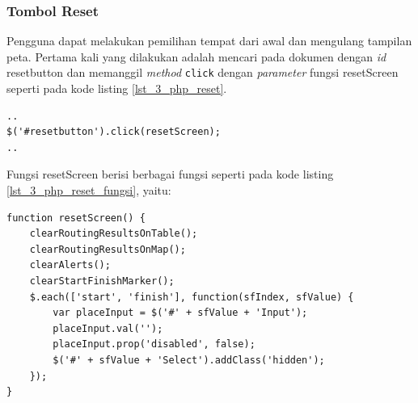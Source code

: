 \subsubsection{Tombol Reset}
Pengguna dapat melakukan pemilihan tempat dari awal dan mengulang tampilan peta. Pertama kali yang dilakukan adalah mencari pada dokumen dengan \textit{id} resetbutton dan memanggil \textit{method} \verb!click! dengan \textit{parameter} fungsi resetScreen seperti pada kode listing \ref{lst_3_php_reset}. 

\begin{lstlisting}[caption=\textit{Method} untuk memanggil fungsi JavaScript ketika tombol \textit{reset} ditekan ,label = {lst_3_php_reset}]
..
$('#resetbutton').click(resetScreen);
..
\end{lstlisting}

Fungsi resetScreen berisi berbagai fungsi seperti pada kode listing \ref{lst_3_php_reset_fungsi}, yaitu:

\begin{lstlisting}[caption=Fungsi JavaScript resetScreen ,label = {lst_3_php_reset_fungsi}]	
function resetScreen() {
	clearRoutingResultsOnTable();
	clearRoutingResultsOnMap();
	clearAlerts();
	clearStartFinishMarker();
	$.each(['start', 'finish'], function(sfIndex, sfValue) {
		var placeInput = $('#' + sfValue + 'Input');
		placeInput.val('');	
		placeInput.prop('disabled', false);
		$('#' + sfValue + 'Select').addClass('hidden');
	});
}
\end{lstlisting}

